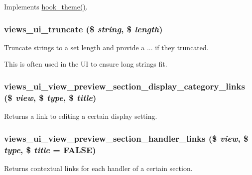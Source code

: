 \label{views__ui_8module_acf90ef9b70c0c8bf9300247b6325aedb}
Implements \hyperlink{group__hooks_ga013ccb45c7aaab1c16cf9691428c910d}{hook\_\-theme()}. \hypertarget{views__ui_8module_a83deaf433f66036af4dd3363c52a936e}{
\subsubsection[{views\_\-ui\_\-truncate}]{\setlength{\rightskip}{0pt plus 5cm}views\_\-ui\_\-truncate (\$ {\em string}, \/  \$ {\em length})}}
\label{views__ui_8module_a83deaf433f66036af4dd3363c52a936e}
Truncate strings to a set length and provide a ... if they truncated.

This is often used in the UI to ensure long strings fit. \hypertarget{views__ui_8module_a768c0cc9ef12c3efe404e8192863e01f}{
\subsubsection[{views\_\-ui\_\-view\_\-preview\_\-section\_\-display\_\-category\_\-links}]{\setlength{\rightskip}{0pt plus 5cm}views\_\-ui\_\-view\_\-preview\_\-section\_\-display\_\-category\_\-links (\$ {\em view}, \/  \$ {\em type}, \/  \$ {\em title})}}
\label{views__ui_8module_a768c0cc9ef12c3efe404e8192863e01f}
Returns a link to editing a certain display setting. \hypertarget{views__ui_8module_a3ae40cf905b934b3054625fdcff0042d}{
\subsubsection[{views\_\-ui\_\-view\_\-preview\_\-section\_\-handler\_\-links}]{\setlength{\rightskip}{0pt plus 5cm}views\_\-ui\_\-view\_\-preview\_\-section\_\-handler\_\-links (\$ {\em view}, \/  \$ {\em type}, \/  \$ {\em title} = {\ttfamily FALSE})}}
\label{views__ui_8module_a3ae40cf905b934b3054625fdcff0042d}
Returns contextual links for each handler of a certain section.


